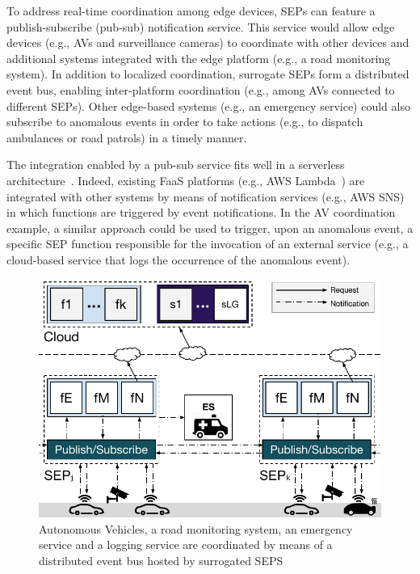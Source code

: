 To address real-time coordination among edge devices, SEPs can feature a publish-subscribe (pub-sub) notification service. This service would allow edge devices (e.g., AVs and surveillance cameras) to coordinate with other devices and additional systems integrated with the edge platform (e.g., a road monitoring system). In addition to localized coordination, surrogate SEPs form a distributed event bus, enabling inter-platform coordination (e.g., among AVs connected to different SEPs). Other edge-based systems (e.g., an emergency service) could also subscribe to anomalous events in order to take actions (e.g., to dispatch ambulances or road patrols) in a timely manner.

The integration enabled by a pub-sub service fits well in a serverless architecture~\cite{Lloyd18serverless}. Indeed, existing FaaS platforms (e.g., AWS Lambda~\cite{AWSLambda}) are integrated with other systems by means of notification services (e.g., AWS SNS) in which functions are triggered by event notifications. In the AV coordination example, a similar approach could be used to trigger, upon an anomalous event, a specific SEP function responsible for the invocation of an external service (e.g., a cloud-based service that logs the occurrence of the anomalous event). 

\begin{figure}[tbp]
	\centering
	\includegraphics[width=1\linewidth]{Figs/Edge_Coordination_AVs_wide.pdf}
	\caption{Autonomous Vehicles, a road monitoring system, an emergency service and a logging service are coordinated by means of a distributed event bus hosted by surrogated SEPS}
	\label{fig:Edge_Coordination_AVs}
\end{figure}

